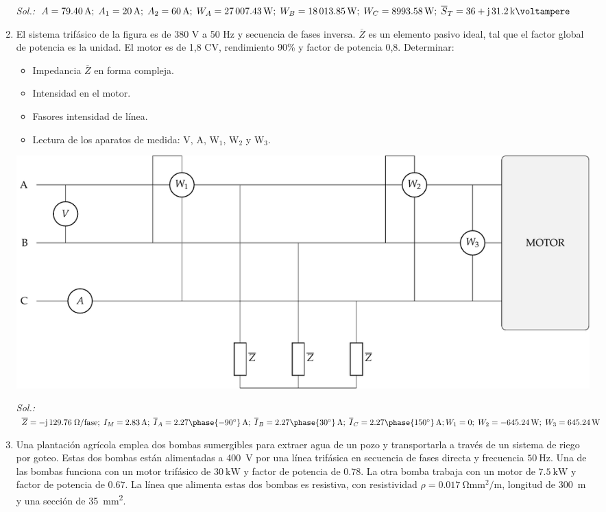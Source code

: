 \begin{enumerate}
  \emph{Sol.:\;
    $A=\qty{79.40}{\ampere};\;
    A_1=\qty{20}{\ampere};\;
    A_2=\qty{60}{\ampere};\; 
    W_A=\qty{27007.43}{\watt};\;
    W_B=\qty{18013.85}{\watt};\;
    W_C=\qty{8993.58}{\watt};\;
    \overline{S}_T=36+\mathrm{j}\,31.2\,\si{\kilo\voltampere} $}

\item El sistema trifásico de la figura es de 380 V a 50 Hz y
  secuencia de fases inversa. $\overline{Z}$ es un elemento pasivo
  ideal, tal que el factor global de potencia es la unidad. El motor
  es de 1,8 CV, rendimiento 90\% y factor de potencia 0,8. Determinar:
  \begin{itemize}
  \item Impedancia $\overline{Z}$ en forma compleja.
  \item Intensidad en el motor.
  \item Fasores intensidad de línea.
  \item Lectura de los aparatos de medida: V, A, W$_1$, W$_2$ y W$_3$.
  \end{itemize}
  \begin{center}
    \includegraphics[width=\linewidth]{../figs/ej7_BT3.pdf}
  \end{center}

  \emph{Sol.:\;
    $\overline{Z}={-\mathrm{j}\,129.76}\;\Omega/\mathrm{fase};\;
    I_M=\qty{2.83}{\ampere};\;
    \overline{I}_A={2.27\phase{-90^\circ}\,\si{\ampere}};\;
    \overline{I}_B={2.27\phase{30^\circ}\,\si{\ampere}};\;
    \overline{I}_C={2.27\phase{150^\circ}\,\si{\ampere}};\; 
    \\
    W_1=0;\;
    W_2=\qty{-645.24}{\watt};\; 
    W_3=\qty{645.24}{\watt}$}

\item  Una plantación agrícola emplea dos bombas sumergibles para extraer
 agua de un pozo y transportarla a través de un sistema de riego por
 goteo. Estas dos bombas están alimentadas a \SI{400}{\volt} por una
 línea trifásica en secuencia de fases directa y frecuencia
 $\SI{50}{\hertz}$. Una de las bombas funciona con un motor trifásico
 de $\SI{30}{\kilo\watt}$ y factor de potencia de $0.78$. La otra bomba
 trabaja con un motor de $\SI{7.5}{\kilo\watt}$ y factor de potencia
 de $0.67$.  La línea que alimenta estas dos bombas es resistiva, con
 resistividad $\rho = \SI{0.017}{\ohm\milli\meter\squared\per\meter}$,
 longitud de \SI{300}{m} y una sección de
 \SI{35}{\milli\meter\squared}.
 

\end{enumerate}

